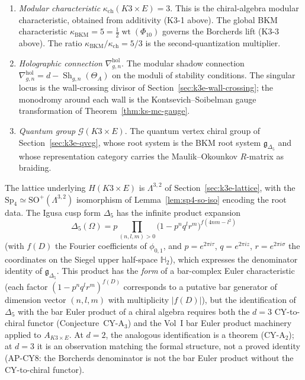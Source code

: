 \begin{construction}
\begin{enumerate}[label=\textup{(\roman*)}]
 \item \emph{Modular characteristic} $\kappa_{\mathrm{ch}}(K3 \times E) = 3$.
 This is the chiral-algebra modular characteristic, obtained
 from additivity (K3-1 above). The global BKM characteristic
 $\kappa_{\mathrm{BKM}} = 5 = \frac{1}{2}\operatorname{wt}(\Phi_{10})$
 governs the Borcherds lift (K3-3 above). The ratio
 $\kappa_{\mathrm{BKM}}/\kappa_{\mathrm{ch}} = 5/3$ is the
 second-quantization multiplier.

 \item \emph{Holographic connection} $\nabla^{\mathrm{hol}}_{g,n}$.
 The modular shadow connection
 $\nabla^{\mathrm{hol}}_{g,n} = d - \operatorname{Sh}_{g,n}(\Theta_A)$
 on the moduli of stability conditions. The singular locus
 is the wall-crossing divisor of Section~\ref{sec:k3e-wall-crossing};
 the monodromy around each wall is the Kontsevich--Soibelman
 gauge transformation of
 Theorem~\ref{thm:ks-mc-gauge}.

 \item \emph{Quantum group} $\mathcal{G}(K3 \times E)$.
 The quantum vertex chiral group of
 Section~\ref{sec:k3e-qvcg}, whose root system is the
 BKM root system $\mathfrak{g}_{\Delta_5}$ and whose
 representation category carries the Maulik--Okounkov
 $R$-matrix as braiding.
\end{enumerate}
\end{construction}

\begin{proposition}
\label{prop:k3e-holographic-root-datum}
The lattice underlying $H(K3 \times E)$ is $\Lambda^{3,2}$ of
Section~\ref{sec:k3e-lattice}, with the $\mathrm{Sp}_4 \simeq
\mathrm{SO}^+(\Lambda^{3,2})$ isomorphism of
Lemma~\ref{lem:sp4-so-iso} encoding the root data. The Igusa
cusp form $\Delta_5$ has the infinite product expansion
\[
 \Delta_5(\Omega) = p \prod_{(n,l,m) > 0} \bigl(1 - p^n q^l r^m\bigr)^{f(4nm - l^2)}
\]
(with $f(D)$ the Fourier coefficients of $\phi_{0,1}$, and
$p = e^{2\pi i \tau}$, $q = e^{2\pi i z}$, $r = e^{2\pi i \sigma}$
the coordinates on the Siegel upper half-space $\mathbb{H}_2$),
which expresses the denominator identity of $\mathfrak{g}_{\Delta_5}$.
This product has the \emph{form} of a bar-complex Euler characteristic
(each factor $(1 - p^n q^l r^m)^{f(D)}$ corresponds to a putative
bar generator of dimension vector $(n, l, m)$ with multiplicity
$|f(D)|$), but the identification of $\Delta_5$ with the bar Euler
product of a chiral algebra requires both the $d = 3$ CY-to-chiral
functor (Conjecture~CY-A$_3$) and the Vol~I bar Euler product
machinery applied to $A_{K3 \times E}$. At $d = 2$, the analogous
identification is a theorem (CY-A$_2$); at $d = 3$ it is an
observation matching the formal structure, not a proved identity
(AP-CY8: the Borcherds denominator is not the bar Euler product without the CY-to-chiral functor).
\end{proposition}

